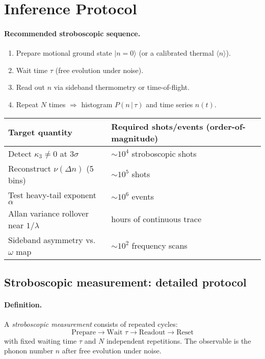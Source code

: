\section{Inference Protocol}

\paragraph{Recommended stroboscopic sequence.}
\begin{enumerate}\itemsep0.2em
  \item Prepare motional ground state $\lvert n=0\rangle$ (or a calibrated thermal $\langle n\rangle$).
  \item Wait time $\tau$ (free evolution under noise).
  \item Read out $n$ via sideband thermometry or time-of-flight.
  \item Repeat $N$ times $\Rightarrow$ histogram $P(n\,|\,\tau)$ and time series $n(t)$.
\end{enumerate}
 
\begin{table}[h]
\centering
\renewcommand{\arraystretch}{1.15}
\begin{tabularx}{0.9\textwidth}{>{\raggedright\arraybackslash}X>{\raggedleft\arraybackslash}p{4.2cm}}
\hline
\textbf{Target quantity} & \textbf{Required shots/events (order-of-magnitude)} \\
\hline
Detect $\kappa_3 \neq 0$ at $3\sigma$ & $\sim 10^4$ stroboscopic shots \\
Reconstruct $\nu(\Delta n)$ (5 bins)  & $\sim 10^5$ shots \\
Test heavy-tail exponent $\alpha$      & $\sim 10^6$ events \\
Allan variance rollover near $1/\lambda$ & hours of continuous trace \\
Sideband asymmetry vs.\ $\omega$ map   & $\sim 10^2$ frequency scans \\
\hline
\end{tabularx}
\end{table}
\subsection{Stroboscopic measurement: detailed protocol}

\paragraph{Definition.}
A \emph{stroboscopic measurement} consists of repeated cycles:
\[
\text{Prepare} \to \text{Wait } \tau \to \text{Readout} \to \text{Reset}
\]
with fixed waiting time $\tau$ and $N$ independent repetitions. 
The observable is the phonon number $n$ after free evolution under noise.

